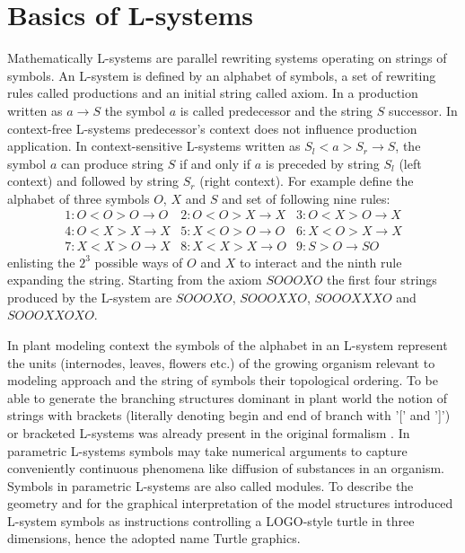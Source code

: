 \section{Basics of L-systems}

Mathematically L-systems  are parallel rewriting  systems operating on
strings of symbols. An L-system  is defined by an alphabet of symbols,
a  set of  rewriting rules  called productions  and an  initial string
called axiom. In a production  written as $a \rightarrow S$ the symbol
$a$  is   called  predecessor  and  the  string   $S$  successor.   In
context-free  L-systems  predecessor's   context  does  not  influence
production  application.  In  context-sensitive  L-systems written  as
$S_l < a  > S_r \rightarrow S$, the symbol $a$  can produce string $S$
if and  only if  $a$ is  preceded by string  $S_l$ (left  context) and
followed  by string  $S_r$ (right  context).  For  example  define the
alphabet of three  symbols $O$, $X$ and $S$ and  set of following nine
rules:
\begin{equation}\label{eq:ca110}
\begin{array}{lll}
1:O < O > O \rightarrow O & 2:O < O > X \rightarrow X &
3:O < X > O \rightarrow X \\ 
4:O < X > X \rightarrow X & 5:X < O > O \rightarrow O&
6:X < O > X \rightarrow X \\
7:X < X > O \rightarrow X & 8:X < X > X \rightarrow O & 
9:S > O \rightarrow SO
\end{array}
\end{equation}
enlisting the $2^3$  possible ways of $O$ and $X$  to interact and the
ninth rule expanding the string.  Starting from the axiom $SOOOXO$ the
first four  strings produced by the L-system  are $SOOOXO$, $SOOOXXO$,
\linebreak $SOOOXXXO$ and $SOOOXXOXO$.

In plant modeling  context the symbols of the  alphabet in an L-system
represent the units (internodes, leaves, flowers etc.)  of the growing
organism relevant to modeling approach and the string of symbols their
topological ordering.  To be able to generate the branching structures
dominant in plant world the notion of strings with brackets (literally
denoting  begin and  end  of branch  with  '[' and  ']') or  bracketed
L-systems   was   already    present   in   the   original   formalism
\citep{lindenmayer:68}.    In   parametric  L-systems   \citep{pp:90a}
symbols   may  take  numerical   arguments  to   capture  conveniently
continuous  phenomena like  diffusion  of substances  in an  organism.
Symbols in parametric L-systems  are also called modules.  To describe
the  geometry  and  for  the  graphical interpretation  of  the  model
structures \citet{pp:86}  introduced L-system symbols  as instructions
controlling   a   LOGO-style   turtle  \citep{abelson:82}   in   three
dimensions, hence the adopted name Turtle graphics.

